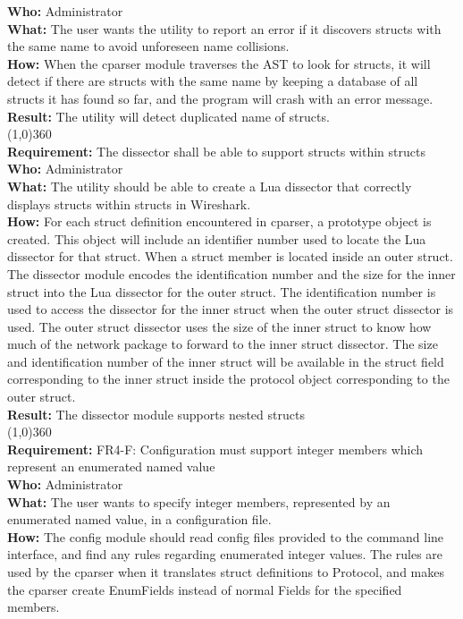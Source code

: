 \textbf{Who:} Administrator\\
\textbf{What:} The user wants the utility to report an error if it discovers structs with the same name to avoid unforeseen name collisions.\\
\textbf{How:} When the cparser module traverses the AST to look for structs, it will detect if there are structs with the same name by keeping a database of all structs it has found so far, and the program will crash with an error message.\\
\textbf{Result:} The utility will detect duplicated name of structs.\\
\line(1,0){360}\\
\textbf{Requirement:} The dissector shall be able to support structs within structs\\
\textbf{Who:} Administrator\\
\textbf{What:} The utility should be able to create a Lua dissector that correctly displays structs within structs in Wireshark. \\
\textbf{How:} For each struct definition encountered in cparser, a prototype object is created. This object will include an identifier number used to locate the Lua dissector for that struct. When a struct member is located inside an outer struct. 
The dissector module encodes the identification number and the size for the inner struct into the Lua dissector for the outer struct. The identification number is used to access the dissector for the inner struct when the outer struct dissector is used. The outer struct dissector uses the size of the inner struct to know how much of the network package to forward to the inner struct dissector.
The size and identification number of the inner struct will be available in the struct field corresponding to the inner struct inside the protocol object corresponding to the outer struct.\\
\textbf{Result:} The dissector module supports nested structs\\
\line(1,0){360}\\
\textbf{Requirement:} FR4-F: Configuration must support integer members which represent an enumerated named value\\
\textbf{Who:} Administrator\\
\textbf{What:} The user wants to specify integer members, represented by an enumerated named value, in a configuration file.\\
\textbf{How:} The config module should read config files provided to the command line interface, and find any rules regarding enumerated integer values. The rules are used by the cparser when it translates struct definitions to Protocol, and makes the cparser create EnumFields instead of normal Fields for the specified members.\\

